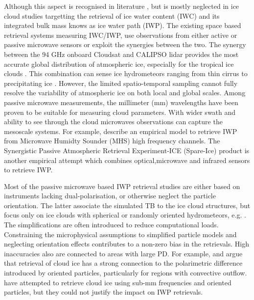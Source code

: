 \documentclass[amt, manuscript]{copernicus}
\begin{document}
Although this aspect is recognised in literature \citep{ xie:polar:11, defer:first:14, gong:micro:17}, but is mostly neglected in ice cloud studies targetting the retrieval of ice water content (IWC) and its integrated bulk mass knows as ice water path (IWP). The existing space based retrieval systems measuring IWC/IWP, use observations from either active or passive microwave sensors or exploit the synergies between the two. The synergy between the 94\,\,GHz  onboard Cloudsat and CALIPSO lidar provides the most accurate global distribution of atmospheric ice, especially for the tropical ice clouds \citep{protat:theev:10}. This combination can sense ice hydrometeors ranging from thin cirrus to precipitating ice \citep{stephens:cloud:18}. However, the limited spatio-temporal sampling cannot fully resolve the  variability of atmospheric ice on both local and global scales. Among passive microwave measurements, the millimeter (mm) wavelengths have been proven to be suitable for measuring cloud parameters. With wider swath and ability to see through the cloud microwaves observations can capture the mesoscale systems. For example, \citet{gong:cloud:14} describe an empirical model to retrieve IWP from Microwave Humidty Sounder (MHS) high frequency channels. The Synergistic Passive Atmospheric Retrieval Experiment-ICE (Spare-Ice) product \citet{holl:spare:14} is another empirical attempt which combines optical,microwave and infrared sensors to retrieve IWP. 

Most of the passive microwave based IWP retrieval studies are either based on instruments lacking dual-polarisation, or otherwise  neglect the particle orientation. The latter associate the simulated TB to the ice cloud structures, but focus only on ice clouds with spherical or randomly oriented hydrometeors, e.g. \citet{evans:icecl:05, Zhao:retri:02}. The simplifications are often introduced to reduce computational loads. Constraining the microphysical assumptions to simplified particle models and neglecting orientation effects contributes to a non-zero bias in the retrievals. High inaccuracies also are connected to areas with large PD. For example, \citet{gong:micro:17} and \citet{miao:thepo:03} argue that retrieval of cloud ice has a strong connection to the polarimetric difference introduced by oriented particles, particularly for regions with convective outflow. \citet{jimenez:2007:perfo} have attempted to retrieve cloud ice using sub-mm frequencies and oriented particles, but they could not justify the impact on IWP retrievals. 
\end{document}
